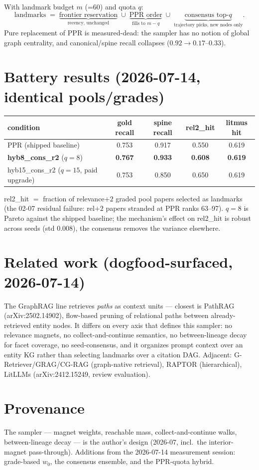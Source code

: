 \documentclass[11pt]{article}
\begin{document}
With landmark budget $m$ (=60) and quota $q$:
\[
  \text{landmarks} \;=\;
  \underbrace{\text{frontier reservation}}_{\text{recency, unchanged}}
  \;\cup\; \underbrace{\text{PPR order}}_{\text{fills to } m-q}
  \;\cup\; \underbrace{\text{consensus top-}q}_{\text{trajectory picks, new nodes only}} .
\]
Pure replacement of PPR is measured-dead: the sampler has no notion of global graph
centrality, and canonical/spine recall collapses ($0.92 \to 0.17$--$0.33$).

\section{Battery results (2026-07-14, identical pools/grades)}

\begin{center}
\begin{tabular}{lcccc}
\toprule
condition & gold recall & spine recall & rel2\_hit & litmus hit \\
\midrule
PPR (shipped baseline) & 0.753 & 0.917 & 0.550 & 0.619 \\
\textbf{hyb8\_cons\_r2} ($q{=}8$) & \textbf{0.767} & \textbf{0.933} & \textbf{0.608} & \textbf{0.619} \\
hyb15\_cons\_r2 ($q{=}15$, paid upgrade) & 0.753 & 0.850 & 0.650 & 0.619 \\
\bottomrule
\end{tabular}
\end{center}

\noindent rel2\_hit $=$ fraction of relevance$+2$ graded pool papers selected as
landmarks (the 02-07 residual failure: rel$+2$ papers stranded at PPR ranks 63--97).
$q{=}8$ is Pareto against the shipped baseline; the mechanism's effect on rel2\_hit is
robust across seeds (std $0.008$), the consensus removes the variance elsewhere.

\section{Related work (dogfood-surfaced, 2026-07-14)}

The GraphRAG line retrieves \emph{paths} as context units — closest is PathRAG
(arXiv:2502.14902), flow-based pruning of relational paths between already-retrieved
entity nodes. It differs on every axis that defines this sampler: no relevance
magnets, no collect-and-continue semantics, no between-lineage decay for facet
coverage, no seed-consensus, and it organizes prompt context over an entity KG rather
than selecting landmarks over a citation DAG. Adjacent: G-Retriever/GRAG/CG-RAG
(graph-native retrieval), RAPTOR (hierarchical), LitLLMs (arXiv:2412.15249,
review evaluation).

\section{Provenance}

The sampler — magnet weights, reachable mass, collect-and-continue walks,
between-lineage decay — is the author's design (2026-07, incl.\ the interior-magnet
pass-through). Additions from the 2026-07-14 measurement session: grade-based $w_0$,
the consensus ensemble, and the PPR-quota hybrid.
\end{document}
